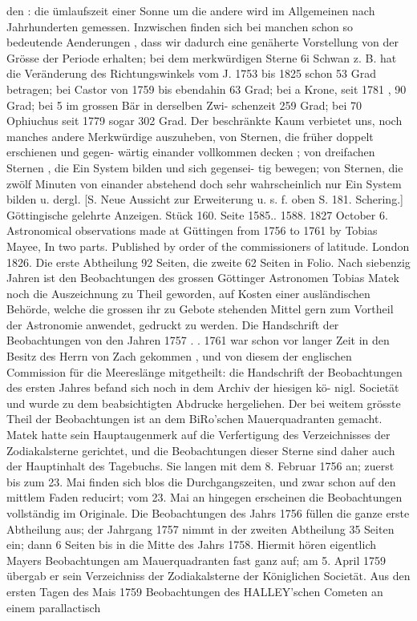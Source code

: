 \documentclass[12pt,a4paper]{article}
\begin{document}
{{{{{{{{den :  die  ümlaufszeit  einer  Sonne  um  die  andere  wird  im  Allgemeinen  nach  Jahrhunderten  gemessen. Inzwischen  finden  sich  bei  manchen  schon  so  bedeutende  Aenderungen ,  dass  wir  dadurch  eine  genäherte Vorstellung  von  der  Grösse  der  Periode  erhalten;  bei  dem  merkwürdigen  Sterne  6i  Schwan  z.  B.  hat die  Veränderung  des  Richtungswinkels  vom  J.  1753  bis  1825  schon  53  Grad  betragen;  bei  Castor  von 1759  bis  ebendahin  63  Grad;  bei  a  Krone,  seit  1781 ,  90  Grad;  bei  5  im  grossen  Bär  in  derselben  Zwi- schenzeit 259  Grad;  bei  70  Ophiuchus  seit  1779  sogar  302  Grad.  Der  beschränkte  Kaum  verbietet  uns, noch  manches  andere  Merkwürdige  auszuheben,  von  Sternen,  die  früher  doppelt  erschienen  und  gegen- wärtig einander  vollkommen  decken ;  von  dreifachen  Sternen ,  die  Ein  System  bilden  und  sich  gegensei- tig bewegen;  von  Sternen,  die  zwölf  Minuten  von  einander  abstehend  doch  sehr  wahrscheinlich  nur  Ein System  bilden  u.  dergl.     [S.  Neue  Aussicht  zur  Erweiterung  u.  s.  f.  oben  S.  181.     Schering.] Göttingische  gelehrte  Anzeigen.     Stück  160.     Seite  1585..  1588.     1827  October  6. Astronomical  observations  made  at  Güttingen  from  1756  to  1761  by  Tobias  Mayee,  In  two  parts. Published  by  order  of  the  commissioners  of  latitude.  London  1826.  Die  erste  Abtheilung  92  Seiten,  die zweite  62  Seiten  in  Folio. Nach  siebenzig  Jahren  ist  den  Beobachtungen  des  grossen  Göttinger  Astronomen  Tobias  Matek noch  die  Auszeichnung  zu  Theil  geworden,  auf  Kosten  einer  ausländischen  Behörde,  welche  die  grossen ihr  zu  Gebote  stehenden  Mittel  gern  zum  Vortheil  der  Astronomie  anwendet,  gedruckt  zu  werden.  Die Handschrift  der  Beobachtungen  von  den  Jahren  1757 . .  1761  war  schon  vor  langer  Zeit  in  den  Besitz  des Herrn  von  Zach  gekommen ,  und  von  diesem  der  englischen  Commission  für  die  Meereslänge  mitgetheilt: die  Handschrift  der  Beobachtungen  des  ersten  Jahres  befand  sich  noch  in  dem  Archiv  der  hiesigen  kö- nigl.  Societät  und  wurde  zu  dem  beabsichtigten  Abdrucke  hergeliehen. Der  bei  weitem  grösste  Theil  der  Beobachtungen  ist  an  dem  BiRo'schen  Mauerquadranten  gemacht. Matek  hatte  sein  Hauptaugenmerk  auf  die  Verfertigung  des  Verzeichnisses  der  Zodiakalsterne  gerichtet, und  die  Beobachtungen  dieser  Sterne  sind  daher  auch  der  Hauptinhalt  des  Tagebuchs.  Sie  langen  mit dem  8.  Februar  1756  an;  zuerst  bis  zum  23.  Mai  finden  sich  blos  die  Durchgangszeiten,  und  zwar  schon auf  den  mittlem  Faden  reducirt;  vom  23.  Mai  an  hingegen  erscheinen  die  Beobachtungen  vollständig im  Originale.  Die  Beobachtungen  des  Jahrs  1756  füllen  die  ganze  erste  Abtheilung  aus;  der  Jahrgang 1757  nimmt  in  der  zweiten  Abtheilung  35  Seiten  ein;  dann  6  Seiten  bis  in  die  Mitte  des  Jahrs  1758. Hiermit  hören  eigentlich  Mayers  Beobachtungen  am  Mauerquadranten  fast  ganz  auf;  am  5.  April  1759 übergab  er  sein  Verzeichniss  der  Zodiakalsterne  der  Königlichen  Societät.  Aus  den  ersten  Tagen  des Mais  1759  Beobachtungen  des  HALLEY'schen  Cometen  an  einem  parallactisch  }}}}}}}}
\end{document}
